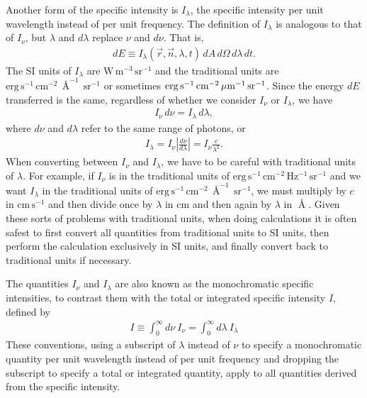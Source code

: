 \newslide

Another form of the specific intensity is $I_\lambda$, the specific
intensity per unit wavelength instead of per unit frequency. The
definition of $I_\lambda$ is analogous to that of $I_\nu$, but $\lambda$
and $d\lambda$ replace $\nu$ and $d\nu$. That is,
\begin{align}
dE \equiv I_\lambda(\vec r, \vec n, \lambda, t)\,dA\,d\Omega\,d\lambda\,dt.
\end{align}
The SI units of
$I_\lambda$ are $\mathrm{W\,m^{-3}\,sr^{-1}}$ and the traditional units are $\mathrm{erg\,s^{-1}\,cm^{-2}\,\Angstrom^{-1}\,sr^{-1}}$
or sometimes $\mathrm{erg\,s^{-1}\,cm^{-2}\,\mbox{$\mu$m}^{-1}\,sr^{-1}}$. Since the
energy $dE$ transferred is the same, regardless of whether we consider
$I_\nu$ or $I_\lambda$, we have
\begin{align}
I_\nu\,d\nu = I_\lambda\,d\lambda,
\end{align}
where $d\nu$ and $d\lambda$ refer to the same range of
photons, or
\begin{align}
I_\lambda = I_\nu \left|\frac{d\nu}{d\lambda}\right| = I_\nu
\frac{c}{\lambda^2}.
\end{align}
When converting between $I_\nu$ and $I_\lambda$, we have to be careful
with traditional units of $\lambda$. For example, if $I_\nu$ is in the
traditional units of $\mathrm{erg\,s^{-1}\,cm^{-2}\,Hz^{-1}\,sr^{-1}}$
and we want $I_\lambda$ in the traditional units of
$\mathrm{erg\,s^{-1}\,cm^{-2}\,\Angstrom^{-1}\,sr^{-1}}$, we must
multiply by $c$ in $\mathrm{cm\,s^{-1}}$ and then divide once by
$\lambda$ in $\mathrm{cm}$ and then again by $\lambda$ in
$\mathrm{\Angstrom}$. Given these sorts of problems with traditional units, when doing calculations it is often safest to first convert all quantities from traditional units to SI units, then perform the calculation exclusively in SI units, and finally convert back to traditional units if necessary. 

\newslide

The quantities $I_\nu$ and $I_\lambda$ are also known as the
monochromatic specific intensities, to contrast them with
the total or integrated specific intensity $I$, defined by
\begin{align}
I \equiv \int_0^\infty\!\!\!d\nu\:I_\nu = \int_0^\infty\!\!\!d\lambda\:I_\lambda
\end{align}
These conventions, using a subscript of $\lambda$ instead of
$\nu$ to specify a monochromatic quantity per unit
wavelength instead of per unit frequency and dropping the
subscript to specify a total or integrated quantity, apply
to all quantities derived from the specific intensity.


